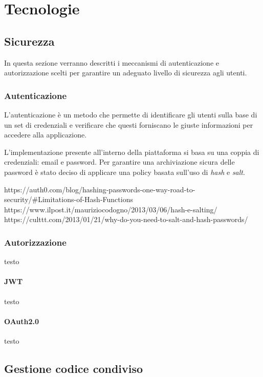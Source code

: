 \chapter{Tecnologie}



\newpage



\section{Sicurezza}
In questa sezione verranno descritti i meccanismi di autenticazione e autorizzazione scelti per
garantire un adeguato livello di sicurezza agli utenti.
\subsection{Autenticazione}
L'autenticazione è un metodo che permette di identificare gli utenti sulla base di un set di credenziali e 
verificare che questi forniscano le giuste informazioni per accedere alla applicazione.

L'implementazione presente all'interno della piattaforma si basa su una coppia di credenziali: email e password.
Per garantire una archiviazione sicura delle password è stato deciso di applicare una policy basata sull'uso di \textit{hash} e \textit{salt}.

https://auth0.com/blog/hashing-passwords-one-way-road-to-security/#Limitations-of-Hash-Functions
https://www.ilpost.it/mauriziocodogno/2013/03/06/hash-e-salting/
https://culttt.com/2013/01/21/why-do-you-need-to-salt-and-hash-passwords/

\subsection{Autorizzazione}
testo
\subsubsection{JWT}
testo
\subsubsection{OAuth2.0}
testo

\section{Gestione codice condiviso}
